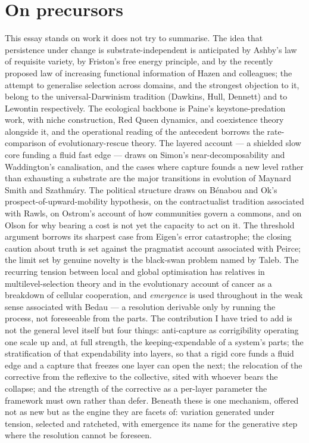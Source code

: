\documentclass[11pt, a4paper]{report}
\begin{document}
\section*{On precursors}

This essay stands on work it does not try to summarise. The idea that persistence under change is substrate-independent is anticipated by Ashby's law of requisite variety, by Friston's free energy principle, and by the recently proposed law of increasing functional information of Hazen and colleagues; the attempt to generalise selection across domains, and the strongest objection to it, belong to the universal-Darwinism tradition (Dawkins, Hull, Dennett) and to Lewontin respectively. The ecological backbone is Paine's keystone-predation work, with niche construction, Red Queen dynamics, and coexistence theory alongside it, and the operational reading of the antecedent borrows the rate-comparison of evolutionary-rescue theory. The layered account --- a shielded slow core funding a fluid fast edge --- draws on Simon's near-decomposability and Waddington's canalisation, and the cases where capture founds a new level rather than exhausting a substrate are the major transitions in evolution of Maynard Smith and Szathmáry. The political structure draws on Bénabou and Ok's prospect-of-upward-mobility hypothesis, on the contractualist tradition associated with Rawls, on Ostrom's account of how communities govern a commons, and on Olson for why bearing a cost is not yet the capacity to act on it. The threshold argument borrows its sharpest case from Eigen's error catastrophe; the closing caution about truth is set against the pragmatist account associated with Peirce; the limit set by genuine novelty is the black-swan problem named by Taleb. The recurring tension between local and global optimisation has relatives in multilevel-selection theory and in the evolutionary account of cancer as a breakdown of cellular cooperation, and \textit{emergence} is used throughout in the weak sense associated with Bedau --- a resolution derivable only by running the process, not foreseeable from the parts. The contribution I have tried to add is not the general level itself but four things: anti-capture as corrigibility operating one scale up and, at full strength, the keeping-expendable of a system's parts; the stratification of that expendability into layers, so that a rigid core funds a fluid edge and a capture that freezes one layer can open the next; the relocation of the corrective from the reflexive to the collective, sited with whoever bears the collapse; and the strength of the corrective as a per-layer parameter the framework must own rather than defer. Beneath these is one mechanism, offered not as new but as the engine they are facets of: variation generated under tension, selected and ratcheted, with emergence its name for the generative step where the resolution cannot be foreseen.
\end{document}
